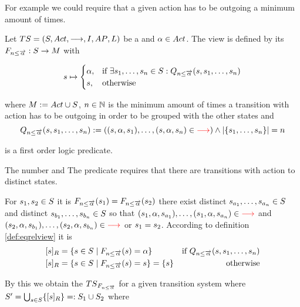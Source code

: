 \documentclass[preview]{standalone}
\begin{document}
For example we could require that a given action has to be outgoing a minimum amount of times. 

\begin{definition}
	Let ${TS} = {({S}, {Act}, {\longrightarrow}, {I}, {AP}, {L})}$ be a \chosengraphtypeN and ${\alpha} \in {Act}$. The view \viewminoutaction is defined by its \grpfctN ${{{{F}}_{{n}\leq{\overrightarrow{\ensuremath{{\alpha}}}}}}} : {S} \to {M}$ with
	
	\[
	{s} \mapsto
	\begin{cases}
		{\alpha},				& \text{if } \exists {s}_1, \dots, {s}_{n} \in {S}:  {Q_{{n}\leq{\overrightarrow{\ensuremath{{\alpha}}}}}({s},{s}_1, \dots, {s}_{{n}})}\\
		{s},          	& \text{otherwise}
	\end{cases}
	\]
	
	where ${{M}} := {{Act} \cup {S}}$, ${n} \in {\mathbb{N}}$ is the minimum amount of times a transition with action \action has to be outgoing in order to be grouped with the other states and
	\[
	{Q_{{n}\leq{\overrightarrow{\ensuremath{{\alpha}}}}}({s},{s}_1, \dots, {s}_{{n}})} := (({s}, {\alpha}, {s}_1), \dots, ({s}, {\alpha}, {s}_{n}) \in {\color{red}\ensuremath{{\longrightarrow}}}) \land |\{{s}_1, \dots, {s}_{n}\}| = {n}
	\]
	
	is a first order logic predicate.
	\label{def:minoutaction}
\end{definition}

The number  and  
The predicate \predminoutact requires that there are transitions with action \action to \numoutact distinct states.

For ${s}_1,{s}_2 \in {S}$ it is ${{{{F}}_{{n}\leq{\overrightarrow{\ensuremath{{\alpha}}}}}}}({s}_1) = {{{{F}}_{{n}\leq{\overrightarrow{\ensuremath{{\alpha}}}}}}}({s}_2)$ \iffN there exist distinct ${s}_{a_1}, \dots, {s}_{a_{n}} \in {S}$ and distinct ${s}_{b_1}, \dots, {s}_{b_{n}} \in {S}$ so that $({s}_1, {\alpha}, {s}_{a_1}), \dots, ({s}_1, {\alpha}, {s}_{a_{n}}) \in {\color{red}\ensuremath{{\longrightarrow}}}$ and $({s}_2, {\alpha}, {s}_{b_1}), \dots, ({s}_2, {\alpha}, {s}_{b_{n}}) \in {\color{red}\ensuremath{{\longrightarrow}}}$ or ${s}_1 = {s}_2$. According to definition \ref{def:eqrelview} it is 
\begin{align*}
	\eqclassv{\state} &= \{\state \in \states \mid \gfctminoutaction(\state) = \action\} &\text{if } \predminoutact \\ 
	\eqclassv{\state} &= \{\state \in \states \mid \gfctminoutaction(\state) = \state\} = \{\state\} &\text{ otherwise}
\end{align*}

By this we obtain the \viewN ${{{{TS}}_{{{{F}}_{{n}\leq{\overrightarrow{\ensuremath{{\alpha}}}}}}}}}$ for a given transition system \ts where ${S}' = \bigcup_{{s} \in {S}} \{{{[{s}]_{{R}}}}\} =: {S}_1 \cup {S}_2$ where 
\end{document}
